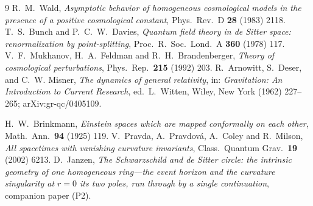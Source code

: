 \documentclass[11pt,a4paper]{article}
\theoremstyle{plain}
\theoremstyle{definition}
\theoremstyle{remark}
\begin{document}
\begin{thebibliography}{9}
 R.~M.~Wald, \emph{Asymptotic behavior of homogeneous cosmological models in the presence of a positive cosmological constant}, Phys.\ Rev.\ D \textbf{28} (1983) 2118.
 T.~S.~Bunch and P.~C.~W.~Davies, \emph{Quantum field theory in de Sitter space: renormalization by point-splitting}, Proc.\ R.\ Soc.\ Lond.\ A \textbf{360} (1978) 117.
 V.~F.~Mukhanov, H.~A.~Feldman and R.~H.~Brandenberger, \emph{Theory of cosmological perturbations}, Phys.\ Rep.\ \textbf{215} (1992) 203.
R.~Arnowitt, S.~Deser, and C.~W. Misner,
\emph{The dynamics of general relativity},
in: \emph{Gravitation: An Introduction to Current Research}, ed.~L.~Witten, Wiley, New York (1962) 227--265; arXiv:gr-qc/0405109.

 H.~W.~Brinkmann, \emph{Einstein spaces which are mapped conformally on each other}, Math.\ Ann.\ \textbf{94} (1925) 119.
 V.~Pravda, A.~Pravdov\'a, A.~Coley and R.~Milson, \emph{All spacetimes with vanishing curvature invariants}, Class.\ Quantum Grav.\ \textbf{19} (2002) 6213.
D.~Janzen,
\emph{The Schwarzschild and de Sitter circle: the intrinsic geometry of one homogeneous ring---the event horizon and the curvature singularity at $r=0$ its two poles, run through by a single continuation}, companion paper (P2).
\end{thebibliography}



\end{document}
